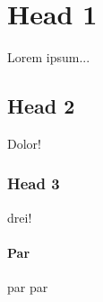 \section{Head 1}
Lorem ipsum...

\subsection{Head 2}
Dolor!

\subsubsection{Head 3}
drei!

\paragraph{Par}
par par

